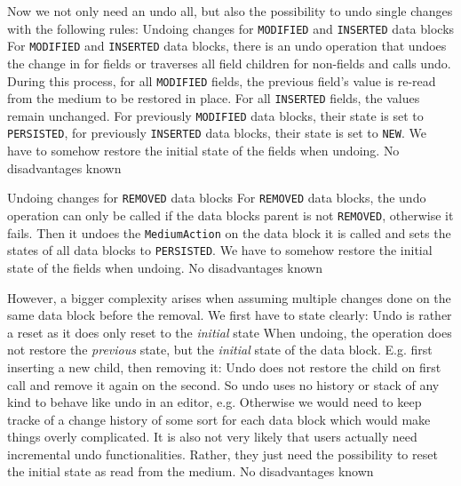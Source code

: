 Now we not only need an undo all, but also the possibility to undo single changes with the following rules:
{%
Undoing changes for \texttt{MODIFIED} and \texttt{INSERTED} data blocks
}
{%
For \texttt{MODIFIED} and \texttt{INSERTED} data blocks, there is an undo operation that undoes the change in \COMPmedia{} for fields or traverses all field children for non-fields and calls undo. During this process, for all \texttt{MODIFIED} fields, the previous field's value is re-read from the medium to be restored in place. For all \texttt{INSERTED} fields, the values remain unchanged. For previously \texttt{MODIFIED} data blocks, their state is set to \texttt{PERSISTED}, for previously \texttt{INSERTED} data blocks, their state is set to \texttt{NEW}.
}
{%
  We have to somehow restore the initial state of the fields when undoing.
}
{%
No disadvantages known
}

{%
Undoing changes for \texttt{REMOVED} data blocks
}
{%
For \texttt{REMOVED} data blocks, the undo operation can only be called if the data blocks parent is not \texttt{REMOVED}, otherwise it fails. Then it undoes the \texttt{MediumAction} on the data block it is called and sets the states of all data blocks to \texttt{PERSISTED}.
}
{%
  We have to somehow restore the initial state of the fields when undoing.
}
{%
No disadvantages known
}

However, a bigger complexity arises when assuming multiple changes done on the same data block before the removal. We first have to state clearly:
{%
Undo is rather a reset as it does only reset to the \emph{initial} state
}
{%
When undoing, the operation does not restore the \emph{previous} state, but the \emph{initial} state of the data block. E.g. first inserting a new child, then removing it: Undo does not restore the child on first call and remove it again on the second. So undo uses no history or stack of any kind to behave like undo in an editor, e.g.
}
{%
Otherwise we would need to keep tracke of a change history of some sort for each data block which would make things overly complicated. It is also not very likely that users actually need incremental undo functionalities. Rather, they just need the possibility to reset the initial state as read from the medium. 
}
{%
No disadvantages known
}

